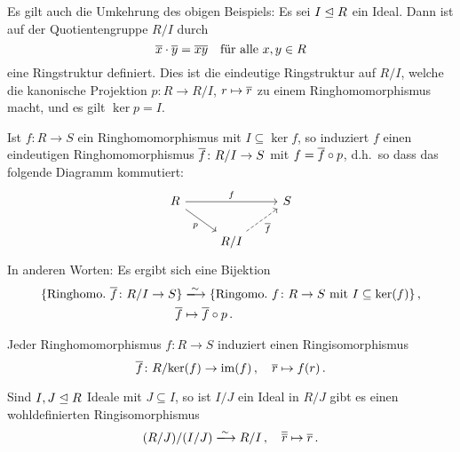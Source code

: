 Es gilt auch die Umkehrung des obigen Beispiels:
Es sei $I \mathrel{\trianglelefteq} R$ ein Ideal.
Dann ist auf der Quotientengruppe $R/I$ durch
\[
    \overline{x} \cdot \overline{y}
  = \overline{xy}
  \quad
  \text{für alle $x, y \in R$}
\]
eine Ringstruktur definiert.
Dies ist die eindeutige Ringstruktur auf $R/I$, welche die kanonische Projektion $p \colon R \to R/I$, $r \mapsto \overline{r}$ zu einem Ringhomomorphismus macht, und es gilt $\ker p = I$.

\begin{theorem}[Homomorphiesatz]
  Ist $f \colon R \to S$ ein Ringhomomorphismus mit $I \subseteq \ker f$, so induziert $f$ einen eindeutigen Ringhomomorphismus $\overline{f} \colon R/I \to S$ mit $f = \overline{f} \circ p$, d.h.\ so dass das folgende Diagramm kommutiert:
  \[
    \begin{tikzcd}
        R
        \arrow{rr}[above]{f}
        \arrow{dr}[below left]{p}
      & {}
      & S
      \\
        {}
      & R/I
        \arrow[dashed]{ru}[below right]{\induced{f}}
      & {}
    \end{tikzcd}
  \]
  In anderen Worten:
  Es ergibt sich eine Bijektion
  \begin{align*}
                            \{ \text{Ringhomo.\ $\induced{f} \colon R/I \to S$} \}
    &\xlongrightarrow{\sim} \{ \text{Ringomo.\ $f \colon R \to S$ mit $I \subseteq \ker(f)$} \} \,,  \\
                            \induced{f}
    &\mapsto                \induced{f} \circ p \,.
  \end{align*}
\end{theorem}

\begin{corollary}[1.\ Isomorphiesatz]
  Jeder Ringhomomorphismus $f \colon R \to S$ induziert einen Ringisomorphismus
  \[
            \overline{f}
    \colon  R/{\ker(f)}
    \to     \operatorname{im}(f) \,,
    \quad   \overline{r}
    \mapsto f(r) \,.
  \]
\end{corollary}

\begin{corollary}[2.\ Isomorphiesatz]
  Sind $I, J \mathrel{\trianglelefteq} R$ Ideale mit $J \subseteq I$, so ist $I/J$ ein Ideal in $R/J$ gibt es einen wohldefinierten Ringisomorphismus
  \[
                            (R/J)/(I/J)
    \xlongrightarrow{\sim}  R/I \,,
    \quad                   \class{\class{r}}
    \mapsto                 \class{r} \,.
  \]

\end{corollary}

